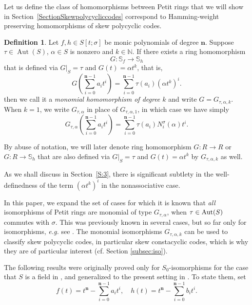 \documentclass[11pt]{amsart}
\theoremstyle{plain}
\theoremstyle{definition}
\newtheorem{definition}[theorem]{Definition}
\numberwithin{equation}{section}
\numberwithin{figure}{section}
\newcommand{\ring}{S}
\newcommand{\Stsigma}{S[t;\sigma]}
\newcommand{\de}{\mathbf{n}}  %
\DeclareMathOperator{\Aut}{Aut}
\begin{document}
Let us define the class of homomorphisms between Petit rings that we will show in Section~\ref{SectionSkewpolycycliccodes} correspond to Hamming-weight preserving homomorphisms of skew polycyclic codes.




\begin{definition}\label{D:Gtaualpha}
    Let $f,h\in \Stsigma$ be monic polynomials of degree $\de$.  Suppose $\tau\in \Aut(\ring)$, $\alpha \in \ring$ is nonzero and $k\in \mathbb{N}$.  If there exists a ring homomorphism 
    $$G:\mathbb{S}_f\to \mathbb{S}_h$$     that
      is  defined via $G|_{S}=\tau$ and $G(t)=\alpha t^k$,    that is,
\begin{equation}\label{E:formulaG(t)2}
G\left( \sum_{i=0}^{\de-1}a_it^i \right) = \sum_{i=0}^{\de-1}\tau(a_i) (\alpha t^k)^i.
\end{equation}
     then we call it a \emph{monomial homomorphism  of degree $k$} and write $G=G_{\tau,\alpha,k}$.  When $k=1$, we write $G_{\tau,\alpha}$ in place of $G_{\tau,\alpha,1}$, in which case we have simply
$$    G_{\tau,\alpha}\left(\sum_{i=0}^{\de-1}a_it^i\right) = \sum_{i=0}^{\de-1}\tau(a_i)N_i^\sigma(\alpha)t^i.    $$
\end{definition}

By abuse of notation, we will later denote ring homomorphism $G: R \to R$ or $G: R\to \mathbb{S}_h$ that are also  defined via $G|_{S}=\tau$ and $G(t)=\alpha t^k$ by $G_{\tau,\alpha,k}$ as well.

As we shall discuss in Section~\ref{S:3}, there is significant subtlety in the well-definedness of the term $(\alpha t^k)^i$ in the nonassociative case.



In this paper, we expand the set of cases for which it is known that \emph{all} isomorphisms of Petit rings are monomial  of type $G_{\tau,\alpha}$, when  $\tau \in {\rm Aut}(S)$ commutes with $\sigma$.  This was previously known in several cases, but so far only for isomorphisms, \emph{e.g.} see \cite[Theorems 28, 29]{BrownPumpluen2018}. The monomial isomorphisms $G_{\tau,\alpha,k}$ can be used to classify skew polycyclic codes, in particular skew constacyclic codes, which is why they are of particular interest (cf. Section \ref{subsec:iso}).


The following results were originally proved only for $\ring_0$-isomorphisms for the case that $\ring$ is a field in \cite[Theorems 28, 29]{BrownPumpluen2018}, and generalized to the present setting in  \cite{Pumpluen2025}.
To state them, set
 $$
    f(t) =t^{\de}- \sum_{i=0}^{\de-1} a_it^i, \quad h(t) = t^{\de}-\sum_{i=0}^{\de-1}b_it^i.
    $$
\end{document}
